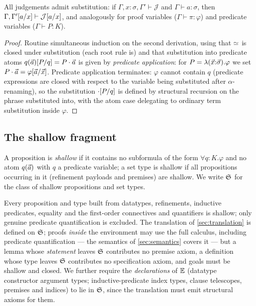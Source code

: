 \begin{lemma}[Substitution]
\label{lem:source-subst}
All judgements admit substitution: if
$\Gamma, x{:}\sigma, \Gamma' \vdash \mathcal{J}$ and $\Gamma \vdash a :
\sigma$, then $\Gamma, \Gamma'[a/x] \vdash
\mathcal{J}[a/x]$, and analogously for proof variables ($\Gamma
\vdash \pi : \varphi$) and predicate variables ($\Gamma \vdash P : K$).
\end{lemma}

\begin{proof}
Routine simultaneous induction on the second derivation, using that
$\simeq$ is closed under substitution (each root rule is) and that
substitution into predicate atoms $q(\vec{a})[P/q] = P \cdot \vec{a}$ is
given by \emph{predicate application}: for $P = \lambda(\vec{x} {:}
\vec{\sigma}).\varphi$ we set $P \cdot \vec{a} =
\varphi[\vec{a}/\vec{x}]$.  Predicate application terminates:
$\varphi$ cannot contain $q$ (predicate expressions are closed with
respect to the variable being substituted after $\alpha$-renaming), so the
substitution $\cdot[P/q]$ is defined by structural recursion on
the phrase substituted into, with the atom case delegating to ordinary
term substitution inside $\varphi$.
\end{proof}

\subsection{The shallow fragment}
\label{sec:calculus-shallow}

\begin{definition}
\label{def:shallow-fragment}
A proposition is \emph{shallow} if it contains no subformula of the form
$\forall q{:}K.\varphi$ and no atom $q(\vec{a})$ with $q$ a predicate
variable; a set type is shallow if all propositions occurring in it
(refinement payloads and premises) are shallow.  We write $\mathfrak{S}$ for the
class of shallow propositions and set types.
\end{definition}

Every proposition and type built from datatypes, refinements, inductive
predicates, equality and the first-order connectives and quantifiers is
shallow; only genuine predicate quantification is excluded.  The
translation of \cref{sec:translation} is defined on $\mathfrak{S}$; proofs
\emph{inside} the environment may use the full calculus, including
predicate quantification --- the semantics of \cref{sec:semantics} covers
it --- but a lemma whose \emph{statement} leaves $\mathfrak{S}$ contributes no
premise axiom, a definition whose type leaves $\mathfrak{S}$ contributes no
specification axiom, and goals must be shallow and closed.  We further
require the \emph{declarations} of $\mathbb{E}$ (datatype constructor argument
types; inductive-predicate index types, clause telescopes, premises and
indices) to lie in $\mathfrak{S}$, since the translation must emit structural
axioms for them.

